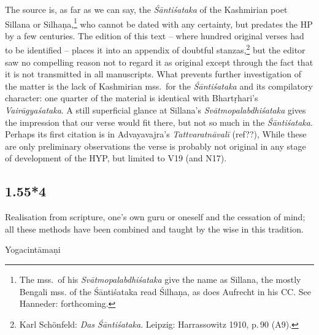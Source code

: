 \begin{ekdosis}
\begin{philcomm}[hp01_055_3]
The source is, as far as we can say, the \emph{Śāntiśataka} of the Kashmirian poet Sillana or
Silhaṇa,\footnote{The mss.\ of his \emph{Svātmopalabdhiśataka} give the name as Sillana, the mostly
Bengali mss. of the Śāntiśataka read Śilhaṇa, as does Aufrecht in his CC. See Hanneder:
forthcoming.} who cannot be dated with any certainty, but predates the HP by a few centuries. The
edition of this text – where hundred original verses had to be identified – places it into an
appendix of doubtful stanzas,\footnote{Karl Schönfeld: \emph{Das Śāntiśataka}. Leipzig:
Harrassowitz 1910, p.\,90 (A9).} but the editor saw no compelling reason not to regard it as
original except through the fact that it is not transmitted in all manuscripts.  What prevents
further investigation of the matter is the lack of Kashmirian mss.\ for the \emph{Śāntiśataka} and
its compilatory character: one quarter of the material is identical with Bhartṛhari's
\emph{Vairāgyaśataka}. A still superficial glance at Sillana's \emph{Svātmopalabdhiśataka} gives
the impression that our verse would fit there, but not so much in the \emph{Śāntiśataka}. Perhaps its first citation is in Advayavajra’s \emph{Tattva\-ratnāvalī} (ref??),  While
these are only preliminary observations the verse is probably not original in any stage of
development of the HYP, but limited to V19 (and N17).
\end{philcomm}

\subsection*{1.55*4}
\begin{translation}[hp01_055_4]
Realisation from scripture, one's own guru or oneself and the cessation of mind; all these methods have been combined and taught by the wise in this tradition.
\end{translation}

\begin{sources}[hp01_055_4]
\end{sources}

\begin{testimonia}[hp01_055_4]
Yogacintāmaṇi

\begin{versinnote}
\end{versinnote}


\end{testimonia}
\end{ekdosis}
